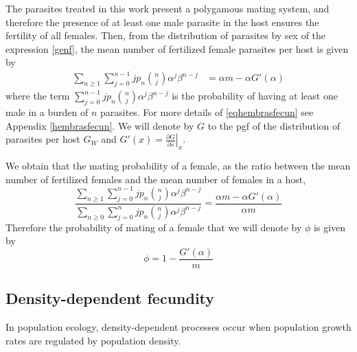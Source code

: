 \documentclass[useAMS,referee,usenatbib]{biom}
\begin{document}
The parasites treated in this work present a polygamous mating system, and therefore the presence of at least one male parasite in the host ensures the fertility of all females.
Then, from the distribution of parasites by sex 
of the expression 
\eqref{genf}, the mean number of fertilized female parasites per host is given by
\begin{equation}\label{eqhembrasfecun}
\begin{split}
\sum_{n\geq 1}\sum_{j=0}^{n-1}j p_n\binom{n}{j}\alpha^j\beta^{n-j}
&=\alpha  m - \alpha G'(\alpha)
\end{split}
\end{equation}
where the term $\sum_{j=0}^{n-1}j p_n\binom{n}{j}\alpha^j\beta^{n-j}$ 
is the probability of having at least one male in a burden of $n$ parasites. 
For more details of \eqref{eqhembrasfecun} see Appendix \eqref{hembrasfecun}. 
We will denote by $G$ to the pgf of the distribution of parasites per host $G_W$
and  $G'(x)=\left.\frac{\partial G}{\partial s}\right|_{x}$.


We obtain that the mating probability of a female, as the ratio between the mean number of fertilized females and the mean number of females in a host,
\begin{equation*}
\frac{\sum_{n\geq 1}\sum_{j=0}^{n-1}jp_n\binom{n}{j}\alpha^j\beta^{n-j}}
{\sum_{n\geq 0}\sum_{j=0}^{n}jp_n\binom{n}{j}\alpha^j\beta^{n-j}}
=\frac{\alpha  m -\alpha  G'(\alpha)}{\alpha m}
\end{equation*}
Therefore the probability of mating of a female that we will denote by $\phi$ is given by
\begin{equation}\label{probrepro1}
\phi=1-\frac{ G'(\alpha)}{m}
\end{equation}

\subsection{Density-dependent fecundity}
In population ecology, density-dependent processes occur when population growth rates are regulated by population density.
\end{document}
